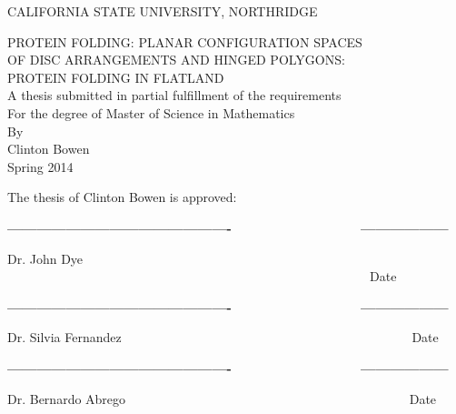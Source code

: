 
\thispagestyle{empty}
\begin{center}
CALIFORNIA STATE UNIVERSITY, NORTHRIDGE

\vspace{1.5in}
PROTEIN FOLDING: PLANAR CONFIGURATION SPACES\\
\vspace{15pt}
OF DISC ARRANGEMENTS AND HINGED POLYGONS:\\
\vspace{15pt}
PROTEIN FOLDING IN FLATLAND\\
\vspace{100pt}
A thesis submitted in partial fulfillment of the requirements\\
For the degree of Master of Science in Mathematics\\
\vspace{50pt}
By\\
\vspace{20pt}
Clinton Bowen \\
\vspace{50pt}
Spring 2014
\end{center}
\pagebreak


\vspace*{30pt}
The thesis of Clinton Bowen is approved:

\vspace*{70pt}

\textbf{---------------------------------------------- \ \ \
\ \ \ \ \ \ \ \ \ \ \ \ \ \ ------------------}

Dr. John Dye \ \ \ \ \ \ \ \ \ \ \ \ \ \ \ \ \ \ \ \ \ \ \ \ \ \ \ \ \ \ \ \ \ \ \ \ \ \ \ \ \ \ \ \ \ \ \ \ \ \ \ \ \ \ \ \ \     Date

\vspace*{30pt}

\textbf{---------------------------------------------- \ \ \
\ \ \ \ \ \ \ \ \ \ \ \ \ \ ------------------}

Dr. Silvia Fernandez \ \ \ \ \ \ \ \ \ \ \ \ \ \ \ \ \ \ \ \ \ \ \ \ \ \ \ \ \ \ \ \ \ \ \ \ \ \ \ \ \ \ \ \ \  Date

\vspace*{30pt}

\textbf{---------------------------------------------- \ \ \
\ \ \ \ \ \ \ \ \ \ \ \ \ \ ------------------}

Dr. Bernardo Abrego \ \ \ \ \ \ \ \ \ \ \ \ \ \ \ \ \ \ \ \ \ \ \ \ \ \ \ \ \ \ \ \ \ \ \ \ \ \ \ \ \ \ \ \  Date

